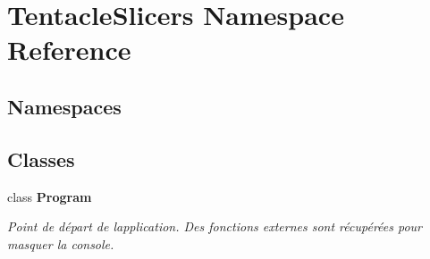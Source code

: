 \hypertarget{namespace_tentacle_slicers}{}\section{Tentacle\+Slicers Namespace Reference}
\label{namespace_tentacle_slicers}
\subsection*{Namespaces}
\begin{DoxyCompactItemize}
\end{DoxyCompactItemize}
\subsection*{Classes}
\begin{DoxyCompactItemize}
\item 
class {\bfseries Program}
\begin{DoxyCompactList}\small\item\em Point de départ de l\textquotesingle{}application. Des fonctions externes sont récupérées pour masquer la console. \end{DoxyCompactList}\end{DoxyCompactItemize}
